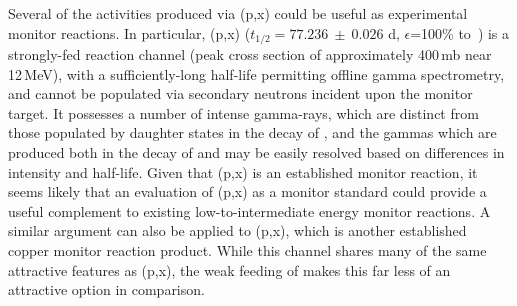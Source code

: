 Several of the activities produced via (p,x)  could be useful as experimental monitor reactions. 
In particular, (p,x) ($t_{1/2}=77.236~\pm~0.026$ d, $\epsilon$=100\% to \,\cite{Junde2011})  is a strongly-fed reaction channel (peak cross section of approximately 400\,mb near 12\,MeV), with a sufficiently-long half-life permitting offline gamma spectrometry,  and  cannot be populated via secondary neutrons incident upon the monitor target. 
It possesses a number of intense gamma-rays, which are distinct from those populated by daughter states in the decay of  , and the gammas which are produced both in the decay of   and   may be easily resolved based on differences in intensity and half-life. 
Given that (p,x) is an established monitor reaction, it seems likely that an evaluation of (p,x) as a monitor standard could provide a useful complement to existing low-to-intermediate energy monitor reactions.
A similar argument can also be applied to (p,x), which is another established copper monitor reaction product.
While this channel shares many of the same attractive features as (p,x), the weak feeding of  makes this far less of an attractive option in comparison.






